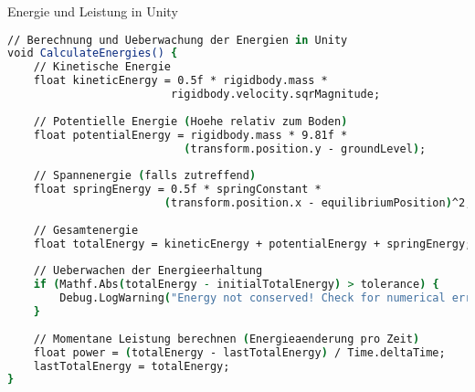 \begin{examplecode}{Energie und Leistung in Unity}\\
    \begin{lstlisting}[language=csh, style=basesmol]
// Berechnung und Ueberwachung der Energien in Unity
void CalculateEnergies() {
    // Kinetische Energie
    float kineticEnergy = 0.5f * rigidbody.mass * 
                         rigidbody.velocity.sqrMagnitude;
    
    // Potentielle Energie (Hoehe relativ zum Boden)
    float potentialEnergy = rigidbody.mass * 9.81f * 
                           (transform.position.y - groundLevel);
    
    // Spannenergie (falls zutreffend)
    float springEnergy = 0.5f * springConstant * 
                        (transform.position.x - equilibriumPosition)^2;
    
    // Gesamtenergie
    float totalEnergy = kineticEnergy + potentialEnergy + springEnergy;
    
    // Ueberwachen der Energieerhaltung
    if (Mathf.Abs(totalEnergy - initialTotalEnergy) > tolerance) {
        Debug.LogWarning("Energy not conserved! Check for numerical errors or non-conservative forces.");
    }
    
    // Momentane Leistung berechnen (Energieaenderung pro Zeit)
    float power = (totalEnergy - lastTotalEnergy) / Time.deltaTime;
    lastTotalEnergy = totalEnergy;
}
    \end{lstlisting}
\end{examplecode}